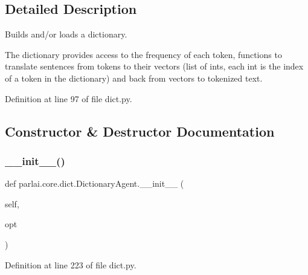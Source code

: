 \subsection{Detailed Description}
\begin{DoxyVerb}Builds and/or loads a dictionary.

The dictionary provides access to the frequency of each token, functions to
translate sentences from tokens to their vectors (list of ints, each int is the
index of a token in the dictionary) and back from vectors to tokenized text.
\end{DoxyVerb}
 

Definition at line 97 of file dict.\+py.



\subsection{Constructor \& Destructor Documentation}
\mbox{\label{classparlai_1_1core_1_1dict_1_1DictionaryAgent_a178d2fa022c5858a23c785f615f831b1}} 
\subsubsection{\texorpdfstring{\+\_\+\+\_\+init\+\_\+\+\_\+()}{\_\_init\_\_()}}
{\footnotesize\ttfamily def parlai.\+core.\+dict.\+Dictionary\+Agent.\+\_\+\+\_\+init\+\_\+\+\_\+ (\begin{DoxyParamCaption}\item[{}]{self,  }\item[{}]{opt }\end{DoxyParamCaption})}



Definition at line 223 of file dict.\+py.


